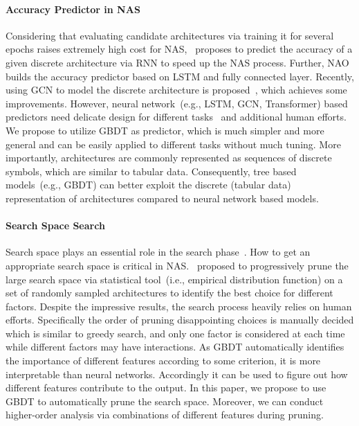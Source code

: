 \documentclass{article}
\begin{document}
\paragraph{Accuracy Predictor in NAS}
Considering that evaluating candidate architectures via training it for several epochs raises extremely high cost for NAS,~\cite{perfpred} proposes to predict the accuracy of a given discrete architecture via RNN to speed up the NAS process. Further, NAO~\cite{nao} builds the accuracy predictor based on LSTM and fully connected layer. Recently, using GCN to model the discrete architecture is proposed~\cite{neuralpredictor}, which achieves some improvements. However, neural network~(e.g., LSTM, GCN, Transformer) based predictors need delicate design for different tasks~\cite{nao,neuralpredictor} and additional human efforts. We propose to utilize GBDT as predictor, which is much simpler and more general and can be easily applied to different tasks without much tuning. More importantly, architectures are commonly represented as sequences of discrete symbols, which are similar to tabular data. Consequently, tree based models~(e.g., GBDT) can better exploit the discrete  (tabular data) representation of architectures compared to neural network based models.

\paragraph{Search Space Search}
Search space plays an essential role in the search phase~\cite{rdarts,evanas}. How to get an appropriate search space is critical in NAS.~\cite{designspace} proposed to progressively prune the large search space via statistical tool~(i.e., empirical distribution function) on a set of randomly sampled architectures to identify the best choice for different factors. Despite the impressive results, the search process heavily relies on human efforts. Specifically the order of pruning disappointing choices is manually decided which is similar to greedy search, and only one factor is considered at each time while different factors may have interactions. As GBDT automatically identifies the importance of different features according to some criterion, it is more interpretable than neural networks. Accordingly it can be used to figure out how different features contribute to the output. In this paper, we propose to use GBDT to automatically prune the search space. Moreover, we can conduct higher-order analysis via combinations of different features during pruning.
\end{document}
